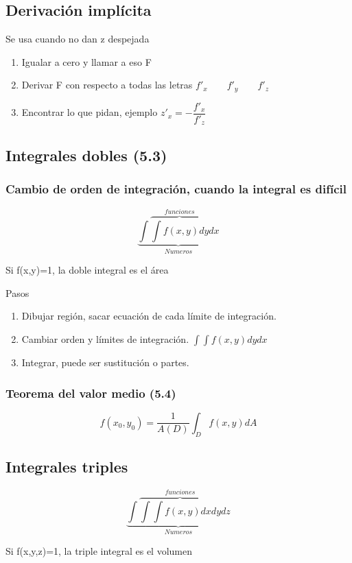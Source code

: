 \subsection{Derivación implícita}
Se usa cuando no dan z despejada

\begin{enumerate}
	\item Igualar a cero y llamar a eso F
	\item Derivar F con respecto a todas las letras $f'_x \qquad f'_y \qquad f'_z$
	\item Encontrar lo que pidan, ejemplo $z'_x=-\dfrac{f'_x}{f'_z}$
\end{enumerate}

\subsection{Integrales dobles (5.3)}

\subsubsection{Cambio de orden de integración, cuando la integral es difícil}

$$\underbrace{\int\overbrace{\int f(x,y)dy}^{funciones}dx}_{Numeros}$$

Si f(x,y)=1, la doble integral es el área

Pasos

\begin{enumerate}
	\item Dibujar región, sacar ecuación de cada límite de integración.
	\item Cambiar orden y límites de integración. $\int\int f(x,y)dydx$
	\item Integrar, puede ser sustitución o partes.
\end{enumerate}

\subsubsection{Teorema del valor medio (5.4)}

$$f(x_0,y_0)=\dfrac{1}{A(D)}\int_Df(x,y)dA$$

\subsection{Integrales triples}
$$\underbrace{\int\overbrace{\int \int f(x,y)dxdy}^{funciones}dz}_{Numeros}$$

Si f(x,y,z)=1, la triple integral es el volumen
